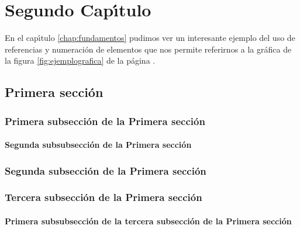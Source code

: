 \chapter{Segundo Cap\'{\i}tulo}
En el cap\'{\i}tulo \ref{chap:fundamentos} pudimos ver un interesante ejemplo
del uso de referencias y numeraci\'on de elementos que nos permite referirnos a la
gr\'afica de la figura \ref{fig:ejemplografica} de la p\'agina
\pageref{fig:ejemplografica}.


\section{Primera secci\'on}
\subsection{Primera subsecci\'on de la Primera secci\'on}
\subsubsection{Segunda subsubsecci\'on de la Primera secci\'on}



\subsection{Segunda subsecci\'on de la Primera secci\'on}
\subsection{Tercera subsecci\'on  de la Primera secci\'on}
\subsubsection{Primera subsubsecci\'on de la tercera subsecci\'on de la Primera secci\'on}

